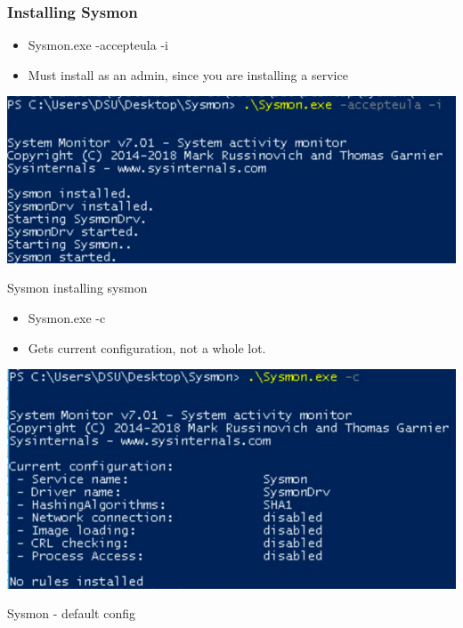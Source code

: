 \subsubsection*{Installing Sysmon}
\begin{itemize}
  \item Sysmon.exe -accepteula -i
  \item Must install as an admin, since you are installing a service
\end{itemize}

\begin{table}[h]
  \centering
  \includegraphics[width=\textwidth]{resources/12-sysmon-installing-sysmon.png}
  \caption{Sysmon installing sysmon}
\end{table}

\begin{itemize}
  \item Sysmon.exe -c
  \item Gets current configuration, not a whole lot.
\end{itemize}
\begin{table}[h]
  \centering
  \includegraphics[width=\textwidth]{resources/12-sysmon-default-config.png}
  \caption{Sysmon - default config}
\end{table}

